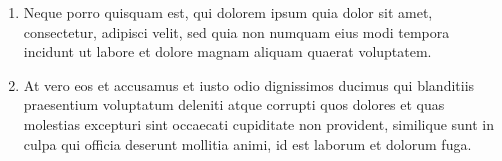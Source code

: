 \begin{enumerate}[label=(\roman*)]
\item Neque porro quisquam est, qui dolorem ipsum quia dolor sit amet, consectetur, adipisci velit, sed quia non numquam eius modi tempora incidunt ut labore et dolore magnam aliquam quaerat voluptatem.

\item At vero eos et accusamus et iusto odio dignissimos ducimus qui blanditiis praesentium voluptatum deleniti atque corrupti quos dolores et quas molestias excepturi sint occaecati cupiditate non provident, similique sunt in culpa qui officia deserunt mollitia animi, id est laborum et dolorum fuga.
\end{enumerate}


